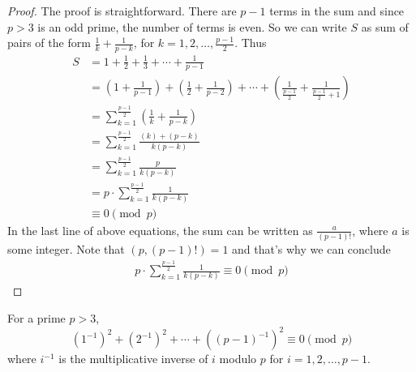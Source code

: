 \documentclass[12pt]{subfile}
\begin{document}
		\begin{proof}
			The proof is straightforward. There are $p-1$ terms in the sum and since $p>3$ is an odd prime, the number of terms is even. So we can write $S$ as sum of pairs of the form $ \frac{1}{k} +‌\frac{1}{p-k}$, for $k=1, 2, \ldots, \frac{p-1}{2}$. Thus
			\begin{align*}
				S
					&= 1+\frac{1}{2}+ \frac{1}{3}+\cdots+ \frac{1}{p-1}\\
					& = \left(1 + \frac{1}{p-1}\right) +‌\left(\frac{1}{2} + \frac{1}{p-2}\right) + \cdots + \left(\frac{1}{\frac{p-1}{2}} + \frac{1}{\frac{p-1}{2}+1}\right)\\
					& = \sum_{k=1}^{\frac{p-1}{2}} \left(\frac{1}{k}+\frac{1}{p-k} \right)\\
					& = \sum_{k=1}^{\frac{p-1}{2}} \frac{(k) + (p-k)}{k(p-k)}\\
					& = \sum_{k=1}^{\frac{p-1}{2}} \frac{p}{k(p-k)}\\
					& =p \cdot \sum_{k=1}^{\frac{p-1}{2}} \frac{1}{k(p-k)}\\
					& \equiv 0 \pmod p
			\end{align*}
			In the last line of above equations, the sum can be written as $\frac{a}{(p-1)!}$, where $a$ is some integer. Note that $(p, (p-1)!)=1$ and that's why we can conclude
				\begin{align*}
					p \cdot \sum_{k=1}^{\frac{p-1}{2}} \frac{1}{k(p-k)} \equiv 0 \pmod p
				\end{align*}
		\end{proof}

		\begin{lemma}\label{lem:wolstproof2} For a prime $p>3$,
			\[(1^{-1})^2+(2^{-1})^2+\cdots+((p-1)^{-1})^2 \equiv 0 \pmod p\] where $i^{-1}$ is the multiplicative inverse of $i$ modulo $p$ for $i=1,2,\ldots,p-1$.
		\end{lemma}
\end{document}
